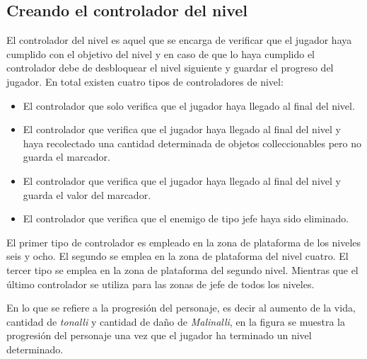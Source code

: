 \subsection{Creando el controlador del nivel}
El controlador del nivel es aquel que se encarga de verificar que el jugador 
haya cumplido con el objetivo del nivel y en caso de que lo haya cumplido el 
controlador debe de desbloquear el nivel siguiente y guardar el progreso del 
jugador. En total existen cuatro tipos de controladores de nivel:
\begin{itemize}
	\item El controlador que solo verifica que el jugador haya llegado al final 
	del nivel.
	\item El controlador que verifica que el jugador haya llegado al final del 
	nivel y haya recolectado una cantidad determinada de objetos colleccionables 
	pero no guarda el marcador.
	\item El controlador que verifica que el jugador haya llegado al final del 
	nivel y guarda el valor del marcador.
	\item El controlador que verifica que el enemigo de tipo jefe haya sido 
	eliminado.
\end{itemize} 

El primer tipo de controlador es empleado en la zona de plataforma de los 
niveles seis y ocho. El segundo se emplea en la zona de plataforma del nivel 
cuatro. El tercer tipo se emplea en la zona de plataforma del segundo nivel. 
Mientras que el último controlador se utiliza para las zonas de jefe de todos 
los niveles.
\\
\par
En lo que se refiere a la progresión del personaje, es decir al aumento de la 
vida, cantidad de \textit{tonalli} y cantidad de daño de \textit{Malinalli}, en 
la figura se muestra la progresión del personaje una vez que el jugador ha 
terminado un nivel determinado.


